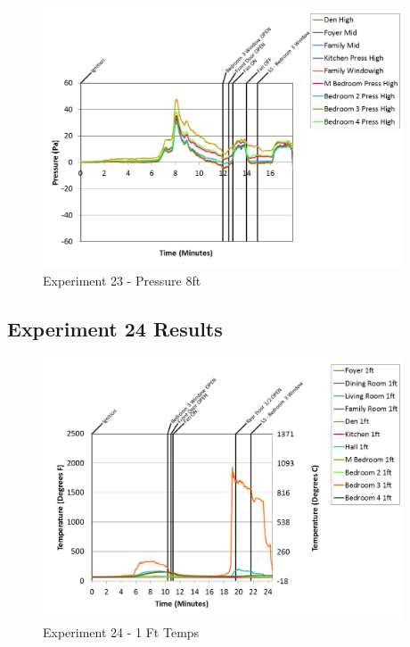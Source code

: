 \documentclass{article}
\begin{document}
\begin{appendices}
\clearpage

\begin{figure}[h!]
	\centering
	\includegraphics[height=3.05in]{0_Images/Results_Charts/Exp_23_Charts/Pressure8ft.png}
	\caption{Experiment 23 - Pressure 8ft}
\end{figure}


\clearpage
\clearpage		\large
\subsection{Experiment 24 Results} \label{App:Exp24Results} 

\begin{figure}[h!]
	\centering
	\includegraphics[height=3.05in]{0_Images/Results_Charts/Exp_24_Charts/1FtTemps.png}
	\caption{Experiment 24 - 1 Ft Temps}
\end{figure}



\end{appendices}
\end{document}
